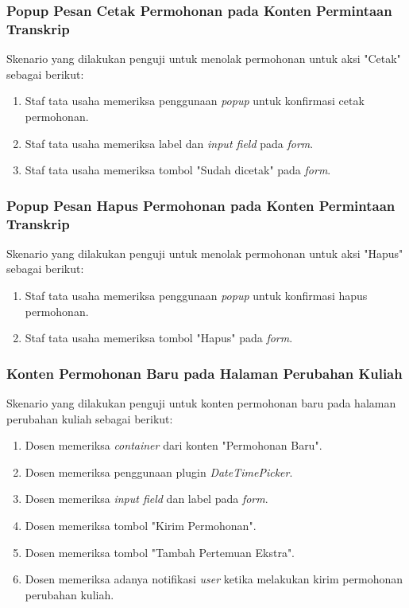 \subsubsection{Popup Pesan Cetak Permohonan pada Konten Permintaan Transkrip}
Skenario yang dilakukan penguji untuk menolak permohonan untuk aksi "Cetak" sebagai berikut:
\begin{enumerate}
	\item Staf tata usaha memeriksa penggunaan \textit{popup} untuk konfirmasi cetak permohonan.
	\item Staf tata usaha memeriksa label dan \textit{input field} pada \textit{form}.
	\item Staf tata usaha memeriksa tombol "Sudah dicetak" pada \textit{form}.	
\end{enumerate}

\subsubsection{Popup Pesan Hapus Permohonan pada Konten Permintaan Transkrip}
Skenario yang dilakukan penguji untuk menolak permohonan untuk aksi "Hapus" sebagai berikut:
\begin{enumerate}
	\item Staf tata usaha memeriksa penggunaan \textit{popup} untuk konfirmasi hapus permohonan.
	\item Staf tata usaha memeriksa tombol "Hapus" pada \textit{form}.	
\end{enumerate}

\subsubsection{Konten Permohonan Baru pada Halaman Perubahan Kuliah}
Skenario yang dilakukan penguji untuk konten permohonan baru pada halaman perubahan kuliah sebagai berikut:
\begin{enumerate}
	\item Dosen memeriksa \textit{container} dari konten "Permohonan Baru".
	\item Dosen memeriksa penggunaan plugin \textit{DateTimePicker}.
	\item Dosen memeriksa \textit{input field} dan label pada \textit{form}.
	\item Dosen memeriksa tombol "Kirim Permohonan".	
	\item Dosen memeriksa tombol "Tambah Pertemuan Ekstra".
	\item Dosen memeriksa adanya notifikasi \textit{user} ketika melakukan kirim permohonan perubahan kuliah.
\end{enumerate}

